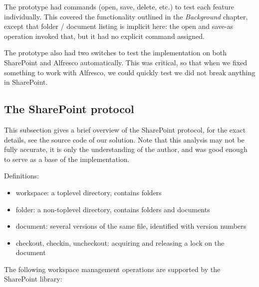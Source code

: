 The prototype had commands (open, save, delete, etc.) to test each feature
individually.  This covered the functionality outlined in the \emph{Background}
chapter, except that folder / document listing is implicit here: the open and
save-as operation invoked that, but it had no explicit command assigned.

The prototype also had two switches to test the implementation on both
SharePoint and Alfresco automatically. This was critical, so that when we fixed
something to work with Alfresco, we could quickly test we did not break
anything in SharePoint.

\subsection{The SharePoint protocol}

This subsection gives a brief overview of the SharePoint protocol, for the
exact details, see the source code of our solution. Note that this analysis may
not be fully accurate, it is only the understanding of the author, and was good
enough to serve as a base of the implementation.

Definitions:

\begin{itemize}
\item workspace: a toplevel directory, contains folders
\item folder: a non-toplevel directory, contains folders and documents
\item document: several versions of the same file, identified with version numbers
\item checkout, checkin, uncheckout: acquiring and releasing a lock on the document
\end{itemize}

The following workspace management operations are supported by the SharePoint
library:

